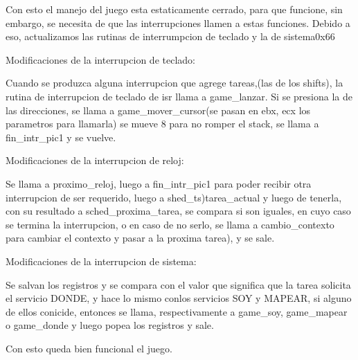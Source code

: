 \documentclass[a4paper]{article}
\begin{document}
Con esto el manejo del juego esta estaticamente cerrado, para que funcione, sin embargo, se necesita de que las interrupciones llamen a estas funciones. Debido a eso, actualizamos las rutinas de interrumpcion de teclado y la de sistema0x66

Modificaciones de la interrupcion de teclado:

Cuando se produzca alguna interrupcion que agrege tareas,(las de los shifts), 
la rutina de interrupcion de teclado de isr llama a game_lanzar. Si se presiona la de las direcciones, se llama a game_mover_cursor(se pasan en ebx, ecx los parametros para llamarla) se mueve 8 para no romper el stack, se llama a fin_intr_pic1 y se vuelve.

Modificaciones de la interrupcion de reloj:

Se llama a proximo_reloj, luego a fin_intr_pic1  para poder recibir otra interrupcion de ser requerido, luego a shed_ts)tarea_actual y luego de tenerla, con su resultado a sched_proxima_tarea, se compara si son iguales, en cuyo caso se termina la interrupcion, o en caso de no serlo, se llama a cambio_contexto para cambiar el contexto y pasar a la proxima tarea),  y se sale.

Modificaciones de la interrupcion de sistema:

Se salvan los registros y se  compara con el valor que significa que la tarea solicita el servicio DONDE, y hace lo mismo conlos servicios SOY y MAPEAR, si alguno de ellos conicide, entonces se llama, respectivamente a game_soy, game_mapear o game_donde y luego popea los registros y sale. 

Con esto queda bien funcional el juego.
\end{document}
